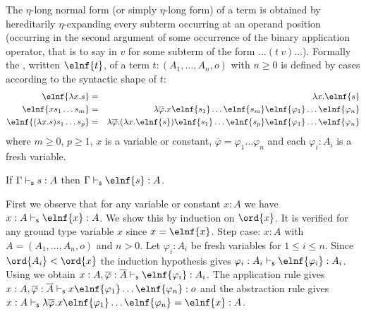 The $\eta$-long normal form (or simply $\eta$-long form) of a term
is obtained by hereditarily $\eta$-expanding every subterm occurring
at an operand position (\ie occurring in the second argument of some
occurrence of the binary application operator, that is to say in $v$
for some subterm of the form $\ldots (t~v) \ldots$). Formally the
, written $\elnf{t}$, of a term $t:
(A_1,\ldots,A_n,o)$ with $n \geq 0$ is defined by cases according to
the syntactic shape of $t$:
\begin{eqnarray*}
  \elnf{\lambda x . s } &=& \lambda x . \elnf{s} \\
  \elnf{x s_1 \ldots s_m } &=& \lambda \overline{\varphi} . x \elnf{s_1}\ldots \elnf{s_m} \elnf{\varphi_1} \ldots \elnf{\varphi_n} \\
  \elnf{(\lambda x . s) s_1 \ldots s_p } &=& \lambda \overline{\varphi} . (\lambda x . \elnf{s}) \elnf{s_1} \ldots \elnf{s_p} \elnf{\varphi_1} \ldots \elnf{\varphi_n}
\end{eqnarray*}
where $m \geq 0$, $p\geq 1$, $x$ is a  variable or constant, $\overline{\varphi} = \varphi_1 \ldots \varphi_n$ and each $\varphi_i : A_i$ is a fresh variable.


\begin{lemma}
\label{lem:elnf_preserves_safety}
If $\Gamma \vdash_{\sf s} s :A$ then $\Gamma \sentail \elnf{s} :A$.
\end{lemma}
\proof

 First we observe that for any variable or constant $x:A$ we have $x:A \sentail \elnf{x} :A$. We show this by induction on $\ord{x}$.
It is verified for any ground type variable $x$
since $x = \elnf{x}$.
Step case: $x:A$ with $A=(A_1, \ldots, A_n,o)$ and $n>0$. Let $\varphi_i:A_i$ be fresh variables for $1\leq i\leq n$.
Since $\ord{A_i} < \ord{x}$ the induction hypothesis gives $\varphi_i :A_i \sentail \elnf{\varphi_i} : A_i$. Using  we obtain $x:A, \overline{\varphi} : \overline{A}
  \sentail \elnf{\varphi_i} :A_i$.  The application rule gives $x :A, \overline{\varphi} : \overline{A} \sentail x \elnf{\varphi_1} \ldots \elnf{\varphi_n}
  : o$ and the abstraction rule gives $ x :A \sentail \lambda
  \overline{\varphi} . x \elnf{\varphi_1} \ldots \elnf{\varphi_n} =
  \elnf{x} :A$.


